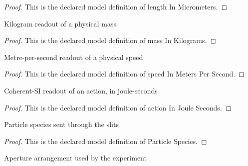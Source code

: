 \begin{proof}
  This is the declared model definition of length In Micrometers.
\end{proof}
\begin{definition}
  \label{def:physics:phyx-mini-0643:phyxminiproblems-problemphyxmini0643-massinkilograms}
  Kilogram readout of a physical mass
\end{definition}
\begin{proof}
  This is the declared model definition of mass In Kilograms.
\end{proof}
\begin{definition}
  \label{def:physics:phyx-mini-0643:phyxminiproblems-problemphyxmini0643-speedinmeterspersecond}
  Metre-per-second readout of a physical speed
\end{definition}
\begin{proof}
  This is the declared model definition of speed In Meters Per Second.
\end{proof}
\begin{definition}
  \label{def:physics:phyx-mini-0643:phyxminiproblems-problemphyxmini0643-actioninjouleseconds}
  Coherent-SI readout of an action, in joule-seconds
\end{definition}
\begin{proof}
  This is the declared model definition of action In Joule Seconds.
\end{proof}
\begin{definition}
  \label{def:physics:phyx-mini-0643:phyxminiproblems-problemphyxmini0643-particlespecies}
  Particle species sent through the slits
\end{definition}
\begin{proof}
  This is the declared model definition of Particle Species.
\end{proof}
\begin{definition}
  \label{def:physics:phyx-mini-0643:phyxminiproblems-problemphyxmini0643-slitarrangement}
  Aperture arrangement used by the experiment
\end{definition}
